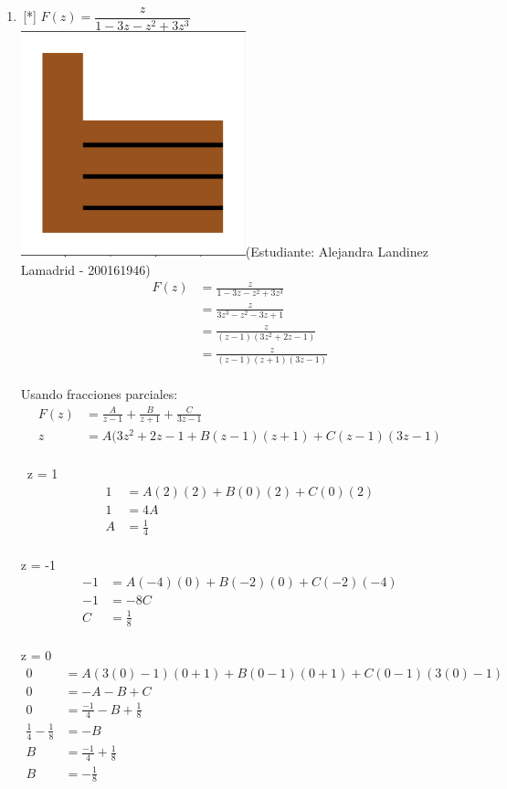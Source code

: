\begin{enumerate}
    \item \,[*] $F(z) = \dfrac{z}{1-3z-z^2+3z^3}$\\
    \includegraphics[width= 10 mm]{figures/exc.png}(Estudiante: Alejandra Landinez Lamadrid - 200161946)\\
    \begin{align*}
        F(z) &= \frac{z}{1-3z-z^2+3z^3}\\
        &= \frac{z}{3z^3-z^2-3z+1}\\
        &= \frac{z}{(z-1)(3z^2+2z-1)}\\
        &= \frac{z}{(z-1)(z+1)(3z-1)}
    \end{align*}\\
    Usando fracciones parciales:\\
    \begin{align*}
        F(z) &= \frac{A}{z-1} + \frac{B}{z+1} + \frac{C}{3z-1}\\
        z &= A(3z^2+2z-1 + B(z-1)(z+1) + C(z-1)(3z-1)
    \end{align*}\\\
    z = 1\\
    \begin{align*}
        1 &= A(2)(2) + B(0)(2) + C(0)(2)\\
        1 &= 4A\\
        A &= \frac{1}{4}
    \end{align*}\\
    z = -1\\
    \begin{align*}
        -1 &= A(-4)(0) + B(-2)(0) + C(-2)(-4)\\
        -1 &= -8C\\
        C &= \frac{1}{8}
    \end{align*}\\
    z = 0\\
    \begin{align*}
        0 &= A(3(0)-1)(0+1) + B(0-1)(0+1) + C(0-1)(3(0)-1)\\
        0 &= -A-B+C\\
        0 &= \frac{-1}{4} - B +\frac{1}{8}\\
        \frac{1}{4} - \frac{1}{8} &= -B\\
        B &= \frac{-1}{4} + \frac{1}{8}\\
        B &= -\frac{1}{8}
    \end{align*}\\

\end{enumerate}

